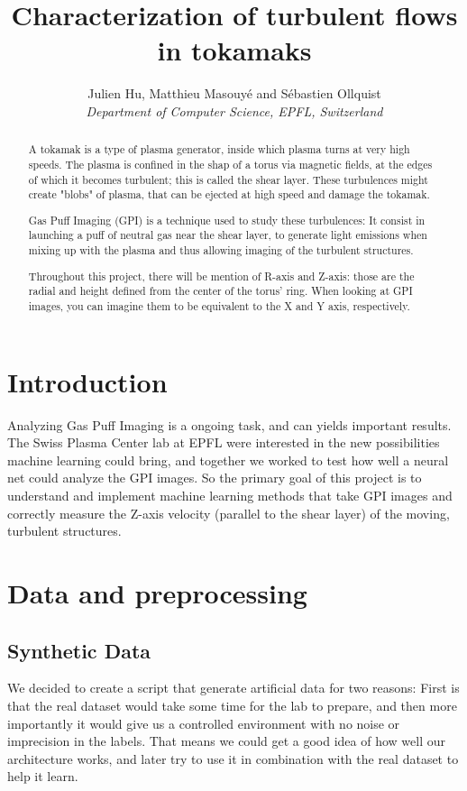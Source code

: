 \documentclass[10pt,conference]{IEEEtran}
\begin{document}
\title{Characterization of turbulent flows in tokamaks}

\author{
  Julien Hu, Matthieu Masouyé and Sébastien Ollquist\\
  \textit{Department of Computer Science, EPFL, Switzerland}
}

\maketitle

\begin{abstract}
  A tokamak is a type of plasma generator, inside which plasma turns at very high speeds. The plasma is confined in the shap of a torus via magnetic fields, at the edges of which it becomes turbulent; this is called the shear layer. These turbulences might create "blobs" of plasma, that can be ejected at high speed and damage the tokamak.\par
  
  Gas Puff Imaging (GPI) is a technique used to study these turbulences: It consist in launching a puff of neutral gas near the shear layer, to generate light emissions when mixing up with the plasma and thus allowing imaging of the turbulent structures.\par

  Throughout this project, there will be mention of R-axis and Z-axis: those are the radial and height defined from the center of the torus' ring. When looking at GPI images, you can imagine them to be equivalent to the X and Y axis, respectively.

\end{abstract}

\section{Introduction}
Analyzing Gas Puff Imaging is a ongoing task, and can yields important results. The Swiss Plasma Center lab at EPFL were interested in the new possibilities machine learning could bring, and together we worked to test how well a neural net could analyze the GPI images.
So the primary goal of this project is to understand and implement machine learning methods that take GPI images and correctly measure the Z-axis velocity (parallel to the shear layer) of the moving, turbulent structures.
\section{Data and preprocessing}
\subsection{Synthetic Data}
We decided to create a script that generate artificial data for two reasons: First is that the real dataset would take some time for the lab to prepare, and then more importantly it would give us a controlled environment with no noise or imprecision in the labels.
That means we could get a good idea of how well our architecture works, and later try to use it in combination with the real dataset to help it learn.\par
\end{document}

